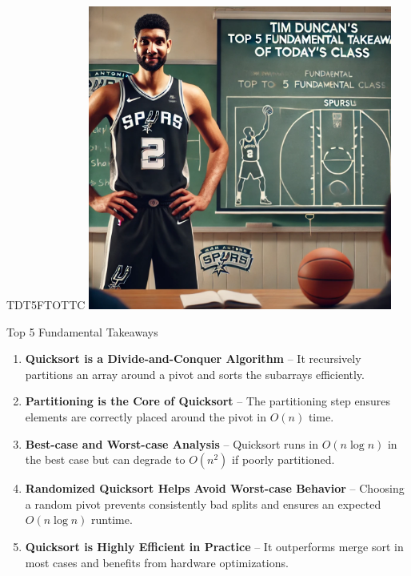 \documentclass{beamer}
\begin{document}
\begin{frame}{TDT5FTOTTC}
    \centering
    \includegraphics[width=0.75\textwidth]{figures/tim.png}
\end{frame}

\begin{frame}{Top 5 Fundamental Takeaways}
    \small
    \begin{enumerate} \pause
        \item[5] \textbf{Quicksort is a Divide-and-Conquer Algorithm} – It recursively partitions an array around a pivot and sorts the subarrays efficiently.\pause

        \item[4] \textbf{Partitioning is the Core of Quicksort} – The partitioning step ensures elements are correctly placed around the pivot in $O(n)$ time.\pause

        \item[3] \textbf{Best-case and Worst-case Analysis} – Quicksort runs in $O(n \log n)$ in the best case but can degrade to $O(n^2)$ if poorly partitioned.\pause

        \item[2] \textbf{Randomized Quicksort Helps Avoid Worst-case Behavior} – Choosing a random pivot prevents consistently bad splits and ensures an expected $O(n \log n)$ runtime.\pause

        \item[1] \textbf{Quicksort is Highly Efficient in Practice} – It outperforms merge sort in most cases and benefits from hardware optimizations.

    \end{enumerate}
\end{frame}
\end{document}
